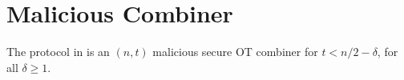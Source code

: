 \section{Malicious Combiner}



\begin{theorem}
	The protocol in  is an $(n,t)$ malicious secure OT combiner for $t < n/2 - \delta$, for all $\delta \geq 1$.
\end{theorem}